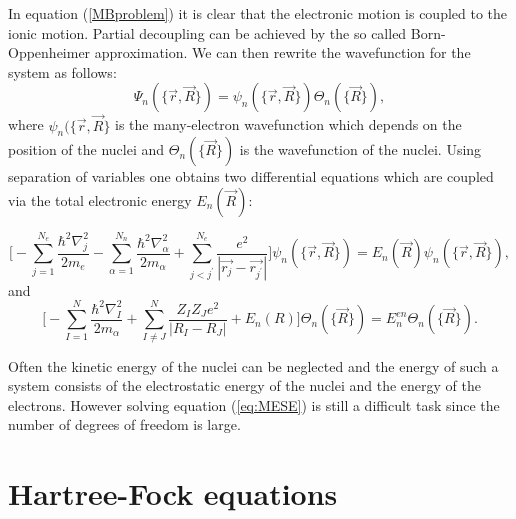 \documentclass[twoside,english]{uiofysmaster}
\begin{document}
In equation (\ref{MBproblem}) it is clear that the electronic motion
is coupled to the ionic motion.  Partial decoupling can be achieved by
the so called Born-Oppenheimer approximation. %
We can then rewrite the wavefunction for the system as
follows:
\[
\Psi_n(\{\vec{r}, \vec{R}\}) = \psi_n(\{\vec{r}, \vec{R}\})\Theta_n(\{\vec{R}\}),
\]
where $\psi_n(\{\vec{r}, \vec{R}\}$ is the many-electron wavefunction which depends on the position of the nuclei and $\Theta_n(\{\vec{R}\})$ is the wavefunction of the nuclei.
Using separation of variables one obtains two differential equations which are coupled via the total electronic energy $E_n(\vec{R})$:

\begin{equation}\label{eq:MESE}
\Bigg[-\sum_{j=1}^{N_e} \frac{\hbar^2\nabla_j^2}{2m_e} -\sum_{\alpha=1}^{N_n} \frac{\hbar^2\nabla_{\alpha}^2}{2m_\alpha} +\sum_{j<j^{\prime}}^{N_e} \frac{e^2}{|\vec{r_j} - \vec{r_{j^{\prime}}}|} \Bigg] \psi_n(\{\vec{r}, \vec{R}\}) = E_n(\vec{R}) \psi_n(\{\vec{r}, \vec{R}\}), 
\end{equation}
and 
\begin{equation}
\Bigg[-\sum_{I=1}^{N} \frac{\hbar^2\nabla_I^2}{2m_\alpha} + \sum_{I\neq J}^{N} \frac{Z_IZ_Je^2}{|R_I-R_J|} + E_n(R)\Bigg]\Theta_n(\{\vec{R}\})=E_n^{en}\Theta_n(\{\vec{R}\}).
\end{equation}

Often the kinetic energy of the nuclei can be neglected and the energy of such a system consists of the electrostatic energy of the nuclei and the energy of the electrons.
However solving equation (\ref{eq:MESE}) is still a difficult task since the number of degrees of freedom is large. 





\section{Hartree-Fock equations} 
\end{document}
